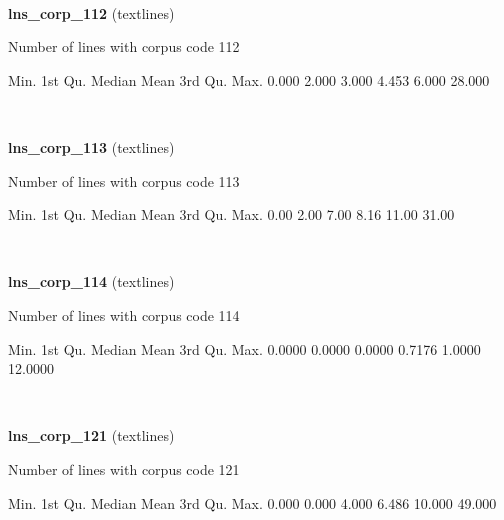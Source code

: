\documentclass[]{article}
\newenvironment{Shaded}{\begin{snugshade}}{\end{snugshade}}
\newcommand{\FloatTok}[1]{\textcolor[rgb]{0.00,0.00,0.81}{{#1}}}
\newcommand{\NormalTok}[1]{{#1}}
\begin{document}
~

\vspace{1em}

\textbf{lns\_corp\_112} (textlines)

Number of lines with corpus code 112

\begin{Shaded}
\begin{Highlighting}[]
   \NormalTok{Min. 1st Qu.  Median    Mean 3rd Qu.    Max. }
  \FloatTok{0.000}   \FloatTok{2.000}   \FloatTok{3.000}   \FloatTok{4.453}   \FloatTok{6.000}  \FloatTok{28.000} 
\end{Highlighting}
\end{Shaded}

~

\vspace{1em}

\textbf{lns\_corp\_113} (textlines)

Number of lines with corpus code 113

\begin{Shaded}
\begin{Highlighting}[]
   \NormalTok{Min. 1st Qu.  Median    Mean 3rd Qu.    Max. }
   \FloatTok{0.00}    \FloatTok{2.00}    \FloatTok{7.00}    \FloatTok{8.16}   \FloatTok{11.00}   \FloatTok{31.00} 
\end{Highlighting}
\end{Shaded}

~

\vspace{1em}

\textbf{lns\_corp\_114} (textlines)

Number of lines with corpus code 114

\begin{Shaded}
\begin{Highlighting}[]
   \NormalTok{Min. 1st Qu.  Median    Mean 3rd Qu.    Max. }
 \FloatTok{0.0000}  \FloatTok{0.0000}  \FloatTok{0.0000}  \FloatTok{0.7176}  \FloatTok{1.0000} \FloatTok{12.0000} 
\end{Highlighting}
\end{Shaded}

~

\vspace{1em}

\textbf{lns\_corp\_121} (textlines)

Number of lines with corpus code 121

\begin{Shaded}
\begin{Highlighting}[]
   \NormalTok{Min. 1st Qu.  Median    Mean 3rd Qu.    Max. }
  \FloatTok{0.000}   \FloatTok{0.000}   \FloatTok{4.000}   \FloatTok{6.486}  \FloatTok{10.000}  \FloatTok{49.000} 
\end{Highlighting}
\end{Shaded}
\end{document}
